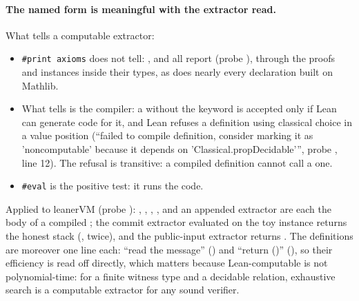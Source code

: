 \paragraph{The named form is meaningful with the extractor read.} What tells a computable
extractor:
\begin{itemize}
\item \texttt{\#print axioms} does not tell: ,  and
   all report  (probe ),
  through the proofs and instances inside their types, as does nearly every declaration built on
  Mathlib.
\item What tells is the compiler: a  without the  keyword is
  accepted only if Lean can generate code for it, and Lean refuses a definition using classical
  choice in a value position (\enquote{failed to compile definition, consider marking it as
  'noncomputable' because it depends on 'Classical.propDecidable'}, probe
  , line 12). The refusal is transitive: a compiled definition
  cannot call a  one.
\item \texttt{\#eval} is the positive test: it runs the code.
\end{itemize}
Applied to leanerVM (probe ): ,
, , \allowbreak{},
\allowbreak{} and an appended extractor are each the body of a compiled
; the commit extractor evaluated on the toy instance returns the honest stack
(, twice), and the public-input extractor returns \lean{()}. The definitions are
moreover one line each: \enquote{read the message} () and
\enquote{return ()} (), so their efficiency is read off directly,
which matters because Lean-computable is not polynomial-time: for a finite witness type and a
decidable relation, exhaustive search is a computable extractor for any sound verifier.

